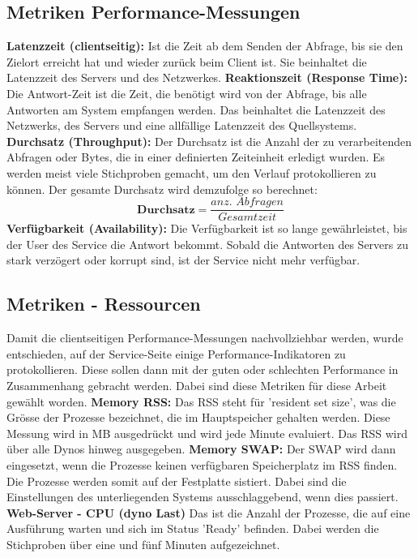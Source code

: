 \documentclass[main.tex]{subfiles}
\begin{document}
\subsection{Metriken Performance-Messungen}

\textbf{Latenzzeit (clientseitig):} Ist die Zeit ab dem Senden der Abfrage, bis sie den Zielort erreicht hat und wieder zurück beim Client ist. Sie beinhaltet die Latenzzeit des Servers und des Netzwerkes. 
\newline
\noindent
\textbf{Reaktionszeit (Response Time):} Die Antwort-Zeit ist die Zeit, die benötigt wird von der Abfrage, bis alle Antworten am System empfangen werden. Das beinhaltet die Latenzzeit des Netzwerks, des Servers und eine allfällige Latenzzeit des Quellsystems.
\newline
\noindent
\textbf{Durchsatz (Throughput):} Der Durchsatz ist die Anzahl der zu verarbeitenden Abfragen oder Bytes, die in einer definierten Zeiteinheit erledigt wurden. Es werden meist viele Stichproben gemacht, um den Verlauf protokollieren zu können. Der gesamte Durchsatz wird demzufolge so berechnet:
\begin{equation}
\textbf{Durchsatz} = \frac{\textit{anz. Abfragen}}{\textit{Gesamtzeit}}
\end{equation}
\newline
\noindent
\textbf{Verfügbarkeit (Availability):} Die Verfügbarkeit ist so lange gewährleistet, bis der User des Service die Antwort bekommt. Sobald die Antworten des Servers zu stark verzögert oder korrupt sind, ist der Service nicht mehr verfügbar. 






\subsection{Metriken - Ressourcen}
Damit die clientseitigen Performance-Messungen nachvollziehbar werden, wurde entschieden, auf der Service-Seite einige Performance-Indikatoren zu protokollieren. Diese sollen dann mit der guten oder schlechten Performance in Zusammenhang gebracht werden. Dabei sind diese Metriken für diese Arbeit gewählt worden.
\newline
\noindent
\textbf{Memory RSS:} Das RSS steht für 'resident set size', was die Grösse der Prozesse bezeichnet, die im Hauptspeicher gehalten werden. Diese Messung wird in MB ausgedrückt und wird jede Minute evaluiert. Das RSS wird über alle Dynos hinweg ausgegeben.
\newline
\noindent
\textbf{Memory SWAP:} Der SWAP wird dann eingesetzt, wenn die Prozesse keinen verfügbaren Speicherplatz im RSS finden. Die Prozesse werden somit auf der Festplatte sistiert. Dabei sind die Einstellungen des unterliegenden Systems ausschlaggebend, wenn dies passiert.
\newline
\noindent
\textbf{Web-Server - CPU (\gls{dyno} Last) } Das ist die Anzahl der Prozesse, die auf eine Ausführung warten und sich im Status ’Ready’ befinden. Dabei werden die Stichproben über eine und fünf Minuten aufgezeichnet.
\end{document}
